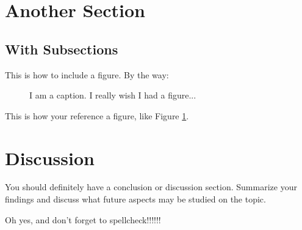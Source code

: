 \documentclass[final]{siamltex}
\begin{document}
\section{Another Section}
\subsection{With Subsections}

This is how to include a figure.  By the way:
\begin{figure}[h!]
\centering
\caption{I am a caption.  I really wish I had a figure...}
\label{myfig}
\end{figure}

This is how your reference a figure, like Figure \ref{myfig}.

\section{Discussion}
You should definitely have a conclusion or discussion section.  Summarize your findings and discuss what future aspects may be studied on the topic. 

Oh yes, and don't forget to spellcheck!!!!!!
 

\nocite{*}		%

\end{document}
